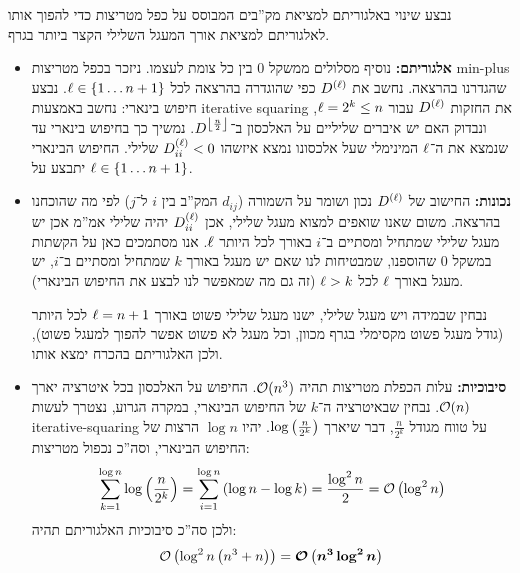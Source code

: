 \documentclass[]{../../../../tex/classes/homework}
\begin{document}
	\npage
	\section{}
	נבצע שינוי באלגוריתם למציאת מק''בים המבוסס על כפל מטריצות כדי להפוך אותו לאלגוריתם למציאת אורך המעגל השלילי הקצר ביותר בגרף. 
	\begin{itemize}
		\item \textbf{אלגוריתם: }נוסיף מסלולים ממשקל $0$ בין כל צומת לעצמו. ניזכר בכפל מטריצות min-plus שהגדרנו בהרצאה. נחשב את $D^{(\ell)}$ כפי שהוגדרה בהרצאה לכל $\ell \in \{1 \dots n + 1\}$. נבצע חיפוש בינארי: נחשב באמצעות iterative squaring את החזקות $D^{(\ell)}$ עבור $\ell = 2^{k} \le n$, ונבדוק האם יש איברים שליליים על האלכסון ב־$D^{\left\lfloor \frac{n}{2} \right\rfloor}$. נמשיך כך בחיפוש בינארי עד שנמצא את ה־$\ell$ המינימלי שעל אלכסונו נמצא איזשהו $D^{(\ell)}_{ii} < 0$ שלילי. החיפוש הבינארי יתבצע על $\ell \in \{1 \dots n + 1\}$. 
		\item \textbf{נכונות: }החישוב של $D^{(\ell)}$ נכון ושומר על השמורה ($d_{ij}$ המק''ב בין $i$ ל־$j$) לפי מה שהוכחנו בהרצאה. משום שאנו שואפים למצוא מעגל שלילי, אכן $D^{(\ell)}_{ii}$ יהיה שלילי אמ''מ אכן יש מעגל שלילי שמתחיל ומסתיים ב־$i$ באורך לכל היותר $\ell$. אנו מסתמכים כאן על הקשתות במשקל $0$ שהוספנו, שמבטיחות לנו שאם יש מעגל באורך $k$ שמתחיל ומסתיים ב־$i$, יש מעגל באורך $\ell$ לכל $\ell > k$ (זה גם מה שמאפשר לנו לבצע את החיפוש הבינארי). 
		
		נבחין שבמידה ויש מעגל שלילי, ישנו מעגל שלילי פשוט באורך $\ell = n + 1$ לכל היותר (גודל מעגל פשוט מקסימלי בגרף מכוון, וכל מעגל לא פשוט אפשר להפוך למעגל פשוט), ולכן האלגוריתם בהכרח ימצא אותו. 
		\item \textbf{סיבוכיות: }עלות הכפלת מטריצות תהיה $\mathcal{O}(n^{3})$. החיפוש על האלכסון בכל איטרציה יארך $\mathcal{O}(n)$. נבחין שבאיטרציה ה־$k$ של החיפוש הבינארי, במקרה הגרוע, נצטרך לעשות iterative-squaring על טווח מגודל $\frac{n}{2^{k}}$, דבר שיארך $\log\left ( \frac{n}{2^{k}} \right )$. יהיו $\log n$ הרצות של החיפוש הבינארי, וסה''כ נכפול מטריצות: 
		\[ \sum_{k = 1}^{\log n}\log\left ( \frac{n}{2^{k}} \right ) = \sum_{i = 1}^{\log n}\left ( \log n - \log k \right ) = \frac{\log ^{2}n}{2} = \mathcal{O}\left ( \log^{2}n \right ) \]
		ולכן סה''כ סיבוכיות האלגוריתם תהיה: 
		\[ \mathcal{O}\left ( \log^{2}n\left ( n^{3} + n \right ) \right ) = \bm{\mathcal{O}\left ( n^{3}\log^{2}n \right )} \]
	\end{itemize}
	
	\npage
\end{document}
